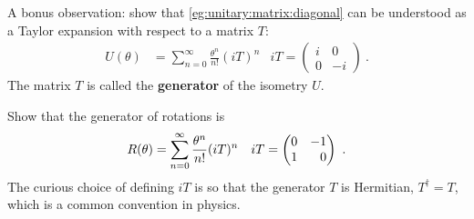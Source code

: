 \documentclass[12pt, oneside]{report}    %
\begin{document}
\begin{exercise}
A bonus observation: show that \eqref{eg:unitary:matrix:diagonal} can be understood as a Taylor expansion with respect to a matrix $T$:
\begin{align}
    U(\theta) &= \sum_{n=0}^\infty \frac{\theta^n}{n!} (iT)^n
    &
    iT=
    \begin{pmatrix}
        i & 0\\
        0 & -i
    \end{pmatrix} \ .
\end{align}
The matrix $T$ is called the \textbf{generator} of the isometry $U$. 
\end{exercise}


\begin{exercise}
Show that the generator of rotations is
\begin{align}
    R(\theta) &= \sum_{n=0}^\infty \frac{\theta^n}{n!} (iT)^n
    &
    iT=
    \begin{pmatrix}
        0 & -1\\
        1 & \pp 0
    \end{pmatrix} \ .
\end{align}
The curious choice of defining $iT$ is so that the generator $T$ is Hermitian, $T^\dag = T$, which is a common convention in physics.
\end{exercise}


\end{document}
